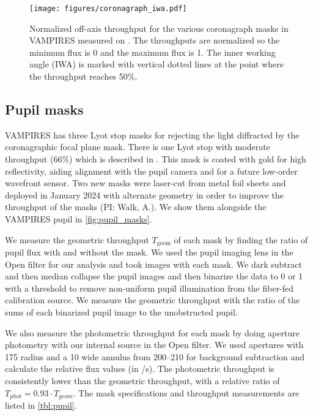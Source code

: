 \begin{figure}
    \centering
    \texttt{[image: figures/coronagraph\_iwa.pdf]}
    \caption{Normalized off-axis throughput for the various coronagraph masks in VAMPIRES measured on . The throughputs are normalized so the minimum flux is 0 and the maximum flux is 1. The inner working angle (IWA) is marked with vertical dotted lines at the point where the throughput reaches 50\%.\label{fig:iwa}}
\end{figure}

\subsection{Pupil masks}

VAMPIRES has three Lyot stop masks for rejecting the light diffracted by the coronagraphic focal plane mask. There is one Lyot stop with moderate throughput (66\%) which is described in \citet{lucas_visible-light_2022}. This mask is coated with gold for high reflectivity, aiding alignment with the pupil camera and for a future low-order wavefront sensor. Two new masks were laser-cut from metal foil sheets and deployed in January 2024 with alternate geometry in order to improve the throughput of the masks (PI: Walk, A.). We show them alongside the VAMPIRES pupil in \autoref{fig:pupil_masks}.

We measure the geometric throughput $T_\mathrm{geom}$ of each mask by finding the ratio of pupil flux with and without the mask. We used the pupil imaging lens in the Open filter for our analysis and took images with each mask. We dark subtract and then median collapse the pupil images and then binarize the data to 0 or 1 with a threshold to remove non-uniform pupil illumination from the fiber-fed calibration source. We measure the geometric throughput with the ratio of the sums of each binarized pupil image to the unobstructed pupil.

We also measure the photometric throughput for each mask by doing aperture photometry with our internal source in the Open filter. We used apertures with \SI{175}{\pixel} radius and a \SI{10}{\pixel} wide annulus from \SIrange{200}{210}{\pixel} for background subtraction and calculate the relative flux values (in \si{\electron/\second}). The photometric throughput is consistently lower than the geometric throughput, with a relative ratio of $T_{phot}=0.93\cdot T_{geom}$. The mask specifications and throughput measurements are listed in \autoref{tbl:pupil}.


